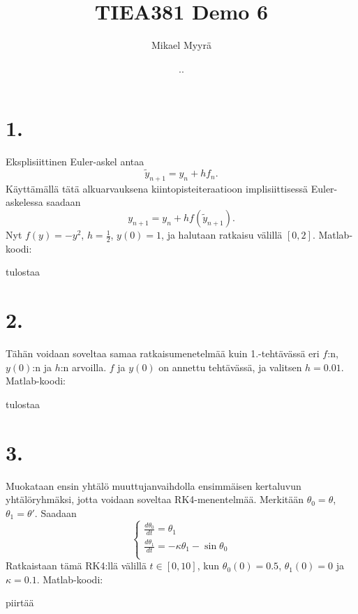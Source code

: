 \documentclass{article}
\title{TIEA381 Demo 6}
\author{Mikael Myyrä}
\date{\number\day.\number\month.\number\year}
\begin{document}
\maketitle

\section*{1.}

Eksplisiittinen Euler-askel antaa
\[
  \tilde{y}_{n+1} = y_n + hf_n.
\]
Käyttämällä tätä alkuarvauksena kiintopisteiteraatioon implisiittisessä
Euler-askelessa saadaan
\[
  y_{n+1} = y_n + hf(\tilde{y}_{n+1}).
\]
Nyt $f(y) = -y^2$, $h = \frac{1}{2}$, $y(0) = 1$, ja halutaan ratkaisu välillä $[0,2]$.
Matlab-koodi:



tulostaa




\section*{2.}

Tähän voidaan soveltaa samaa ratkaisumenetelmää kuin 1.-tehtävässä
eri $f$:n, $y(0)$:n ja $h$:n arvoilla. $f$ ja $y(0)$ on annettu tehtävässä,
ja valitsen $h = 0.01$. Matlab-koodi:



tulostaa




\section*{3.}

Muokataan ensin yhtälö muuttujanvaihdolla ensimmäisen kertaluvun yhtälöryhmäksi,
jotta voidaan soveltaa RK4-menentelmää. Merkitään $\theta_0 = \theta$,
$\theta_1 = \theta'$. Saadaan
\[
  \begin{cases}
    \frac{d\theta_0}{dt} = \theta_1 \\
    \frac{d\theta_1}{dt} = -\kappa \theta_1 - \sin \theta_0 \\
  \end{cases}
\]
Ratkaistaan tämä RK4:llä välillä $t \in [0,10]$, kun $\theta_0(0) = 0.5$,
$\theta_1(0) = 0$ ja $\kappa = 0.1$. Matlab-koodi:



piirtää
\end{document}

